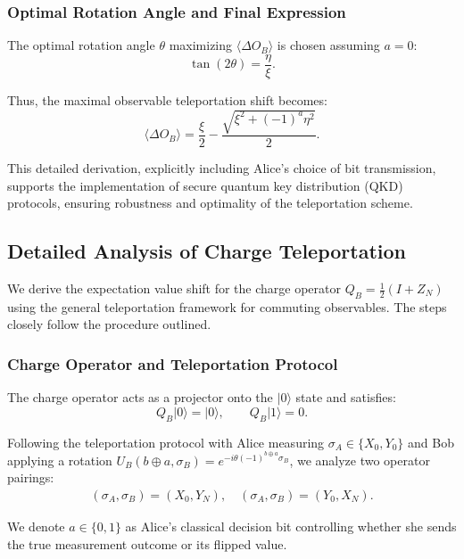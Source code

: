\subsubsection{Optimal Rotation Angle and Final Expression}

The optimal rotation angle $\theta$ maximizing $\langle\Delta O_B\rangle$ is chosen assuming $a=0$:
\begin{equation}
\tan(2\theta)=\frac{\eta}{\xi}.
\end{equation}

Thus, the maximal observable teleportation shift becomes:
\begin{equation}
\langle\Delta O_B\rangle=\frac{\xi}{2}-\frac{\sqrt{\xi^2+(-1)^a\eta^2}}{2}.
\end{equation}

This detailed derivation, explicitly including Alice’s choice of bit transmission, supports the implementation of secure quantum key distribution (QKD) protocols, ensuring robustness and optimality of the teleportation scheme.

\subsection{Detailed Analysis of Charge Teleportation}
\label{appendix:charge_teleportation}

We derive the expectation value shift for the charge operator \( Q_B = \frac{1}{2}(I + Z_N) \) using the general teleportation framework for commuting observables. The steps closely follow the procedure outlined.

\subsubsection{Charge Operator and Teleportation Protocol}

The charge operator acts as a projector onto the \(|0\rangle\) state and satisfies:
\[
Q_B |0\rangle = |0\rangle, \qquad Q_B |1\rangle = 0.
\]

Following the teleportation protocol with Alice measuring \( \sigma_A \in \{X_0, Y_0\} \) and Bob applying a rotation \( U_B(b\oplus a, \sigma_B) = e^{-i\theta(-1)^{b\oplus a}\sigma_B} \), we analyze two operator pairings:
\begin{align*}
(\sigma_A, \sigma_B) = (X_0, Y_N), \quad (\sigma_A, \sigma_B) = (Y_0, X_N).
\end{align*}

We denote \( a \in \{0,1\} \) as Alice’s classical decision bit controlling whether she sends the true measurement outcome or its flipped value.

